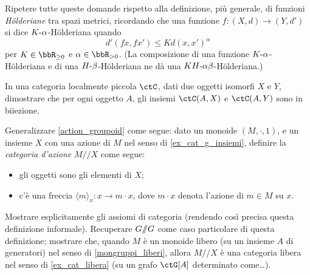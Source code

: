 \begin{esercizi}
	Ripetere tutte queste domande rispetto alla definizione, più generale, di funzioni \emph{H\"olderiane} tra spazi metrici, ricordando che una funzione \(f : (X,d)\to (Y,d')\) si dice \(K\text{-}\alpha\)-H\"olderiana quando
	\[d'(fx,fx')\le Kd(x,x')^\alpha\]
	per \(K\in \bbR_{\ge 0}\) e \(\alpha\in \bbR_{>0}\).
	(La composizione di una funzione \(K\text{-}\alpha\)-H\"olderiana e di una \(H\text{-}\beta\)-H\"olderiana ne dà una \(KH\text{-}\alpha\beta\)-H\"olderiana.)
	\item\label{isounico} In una categoria localmente piccola \(\ctC\), dati due oggetti isomorfi \(X\) e \(Y\), dimostrare che per ogni oggetto \(A\), gli insiemi \(\Hom{\ctC}(A,X)\) e \(\Hom{\ctC}(A,Y)\) sono in biiezione.
	\item Generalizzare \ref{action_groupoid} come segue: dato un monoide \((M,\cdot,1)\), e un insieme \(X\) con una azione di \(M\) nel senso di \ref{ex_cat_g_insiemi}, definire la \emph{categoria d'azione} \(M/\!\!/X\) come segue:
	\begin{itemize}
		\item gli oggetti sono gli elementi di \(X\);
		\item c'è una freccia \(\langle m\rangle_x : x\to m\cdot x\), dove \(m\cdot x\) denota l'azione di \(m\in M\) su \(x\).
	\end{itemize}
	Mostrare esplicitamente gli assiomi di categoria (rendendo così precisa questa definizione informale). Recuperare \(G/\!\!/G\)  come caso particolare di questa definizione; mostrare che, quando \(M\) è un monoide libero (su un insieme \(A\) di generatori) nel senso di \ref{mongruppi_liberi}, allora \(M/\!\!/X\) è una categoria libera nel senso di \ref{ex_cat_libera} (su un grafo \(\ctG[A]\) determinato come\dots).
\end{esercizi}
